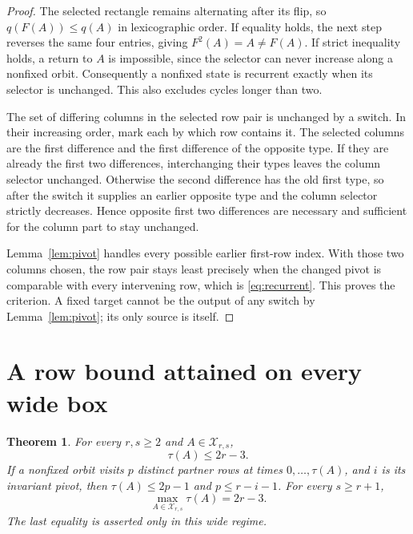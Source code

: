\documentclass[a4paper,10pt]{amsart}
\newtheorem{theorem}{Theorem}[section]
\theoremstyle{remark}
\newcommand{\X}{\mathcal X}
\begin{document}
\begin{proof}
The selected rectangle remains alternating after its flip, so
$q(F(A))\le q(A)$ in lexicographic order. If equality holds, the next
step reverses the same four entries, giving $F^2(A)=A\ne F(A)$.
If strict inequality holds, a return to $A$ is impossible, since the
selector can never increase along a nonfixed orbit. Consequently a
nonfixed state is recurrent exactly when its selector is unchanged.
This also excludes cycles longer than two.

The set of differing columns in the selected row pair is unchanged by
a switch. In their increasing order, mark each by which row contains it.
The selected columns are the first difference and the first difference
of the opposite type. If they are already the first two differences,
interchanging their types leaves the column selector unchanged.
Otherwise the second difference has the old first type, so after the
switch it supplies an earlier opposite type and the column selector
strictly decreases. Hence opposite first two differences are necessary
and sufficient for the column part to stay unchanged.

Lemma~\ref{lem:pivot} handles every possible earlier first-row index.
With those two columns chosen, the row pair stays least precisely when
the changed pivot is comparable with every intervening row, which is
\eqref{eq:recurrent}. This proves the criterion. A fixed target cannot
be the output of any switch by Lemma~\ref{lem:pivot}; its only source
is itself.
\end{proof}

\section{A row bound attained on every wide box}

\begin{theorem}\label{thm:tail}
For every $r,s\ge2$ and $A\in\X_{r,s}$,
\begin{equation}\label{eq:bound}
 \tau(A)\le 2r-3 .
\end{equation}
If a nonfixed orbit visits $p$ distinct partner rows at times
$0,\ldots,\tau(A)$, and $i$ is its invariant pivot, then
$\tau(A)\le2p-1$ and $p\le r-i-1$. For every $s\ge r+1$,
\[
 \max_{A\in\X_{r,s}}\tau(A)=2r-3.
\]
The last equality is asserted only in this wide regime.
\end{theorem}
\end{document}
